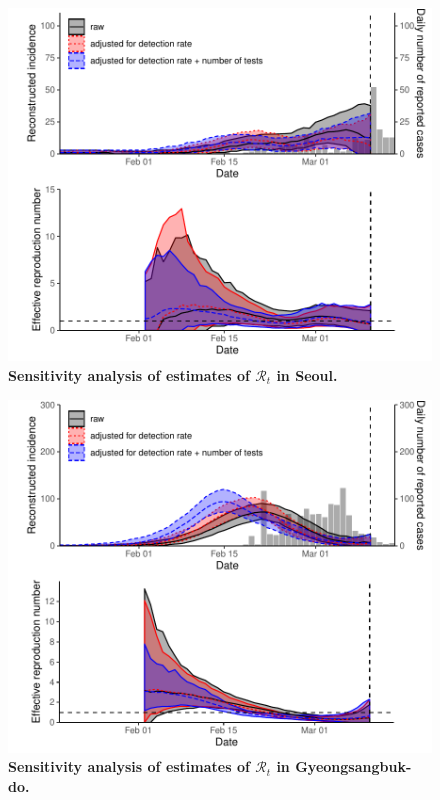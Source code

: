 \documentclass[12pt]{article}
\begin{document}
\pagebreak

\begin{figure}[!ht]
\includegraphics[width=\textwidth]{figure_R_t_seoul.pdf}
\caption{
\textbf{Sensitivity analysis of estimates of $\mathcal R_t$ in Seoul.}
}
\end{figure}

\pagebreak

\begin{figure}[!ht]
\includegraphics[width=\textwidth]{figure_R_t_gyeongbuk.pdf}
\caption{
\textbf{Sensitivity analysis of estimates of $\mathcal R_t$ in Gyeongsangbuk-do.}
}
\end{figure}
\end{document}
